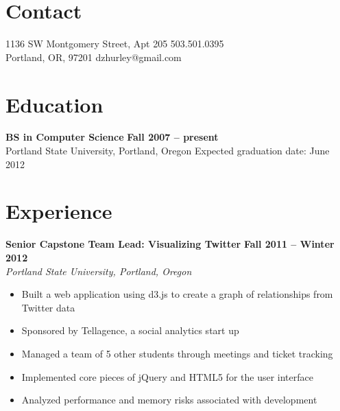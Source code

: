 \documentclass[margin,line]{resume}
\begin{document}
\begin{resume}

    \section{\mysidestyle Contact}

    1136 SW Montgomery Street, Apt 205 \hfill 503.501.0395       \vspace{0mm}\\\vspace{0mm}%
    Portland, OR, 97201                \hfill dzhurley@gmail.com \vspace{0mm}\\\vspace{0mm}%

    \section{\mysidestyle Education}

    \textbf{BS in Computer Science}             \hfill \textbf{ Fall 2007 -- present}      \vspace{2mm}\\\vspace{1mm}%
    Portland State University, Portland, Oregon \hfill Expected graduation date: June 2012 \vspace{-3mm}\\\vspace{-1mm}%

    \section{\mysidestyle Experience}

    \textbf{Senior Capstone Team Lead: Visualizing Twitter} \hfill \textbf{Fall 2011 -- Winter 2012} \vspace{2mm}\\\vspace{1mm}%
    \textsl{Portland State University, Portland, Oregon}
    \begin{itemize}
        \item Built a web application using d3.js to create a graph of relationships from Twitter data
        \item Sponsored by Tellagence, a social analytics start up
        \item Managed a team of 5 other students through meetings and ticket tracking
        \item Implemented core pieces of jQuery and HTML5 for the user interface
        \item Analyzed performance and memory risks associated with development
    \end{itemize}


\end{resume}
\end{document}
